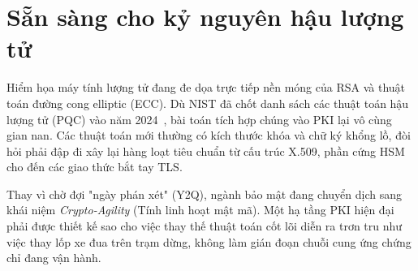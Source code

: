 \section{Sẵn sàng cho kỷ nguyên hậu lượng tử}
\label{sec:7.4}

Hiểm họa máy tính lượng tử đang đe dọa trực tiếp nền móng của RSA và thuật toán đường cong elliptic (ECC). Dù NIST đã chốt danh sách các thuật toán hậu lượng tử (PQC) vào năm 2024~\cite{NIST-PQC2024}, bài toán tích hợp chúng vào PKI lại vô cùng gian nan. Các thuật toán mới thường có kích thước khóa và chữ ký khổng lồ, đòi hỏi phải đập đi xây lại hàng loạt tiêu chuẩn từ cấu trúc X.509, phần cứng HSM cho đến các giao thức bắt tay TLS.

Thay vì chờ đợi "ngày phán xét" (Y2Q), ngành bảo mật đang chuyển dịch sang khái niệm \textit{Crypto-Agility} (Tính linh hoạt mật mã). Một hạ tầng PKI hiện đại phải được thiết kế sao cho việc thay thế thuật toán cốt lõi diễn ra trơn tru như việc thay lốp xe đua trên trạm dừng, không làm gián đoạn chuỗi cung ứng chứng chỉ đang vận hành.
